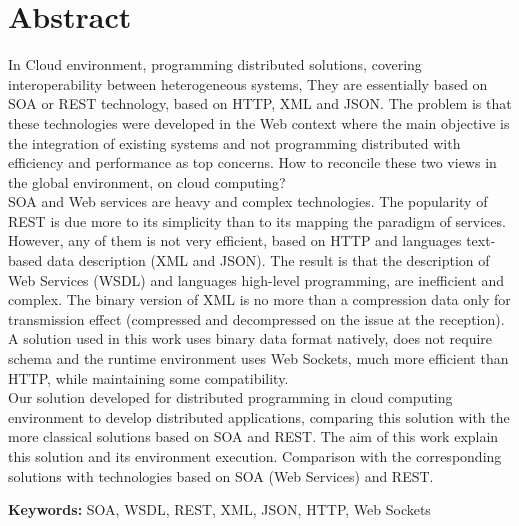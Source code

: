 
\section*{Abstract}


In Cloud environment, programming distributed solutions, covering interoperability between heterogeneous systems,
They are essentially based on SOA or REST technology, based on HTTP, XML and JSON. The problem is that these technologies
were developed in the Web context where the main objective is the integration of existing systems and not programming
distributed with efficiency and performance as top concerns. How to reconcile these two views in the global environment,
on cloud computing?\\

SOA and Web services are heavy and complex technologies. The popularity of REST is due more to its simplicity than to its
mapping the paradigm of services. However, any of them is not very efficient, based on HTTP and languages
text-based data description (XML and JSON). The result is that the description of Web Services (WSDL) and languages
high-level programming, are inefficient and complex. The binary version of XML is no more than a compression
data only for transmission effect (compressed and decompressed on the issue at the reception). A solution used in this
work uses binary data format natively, does not require schema and the runtime environment uses Web Sockets,
much more efficient than HTTP, while maintaining some compatibility.\\

Our solution developed for distributed programming in cloud computing environment to develop
distributed applications, comparing this solution with the more classical solutions based on SOA and REST.
The aim of this work explain this solution and its environment
execution. Comparison with the corresponding solutions with technologies based on SOA (Web Services)
and REST.

\vfill

\textbf{\Large Keywords:} SOA, WSDL, REST, XML, JSON, HTTP, Web Sockets
